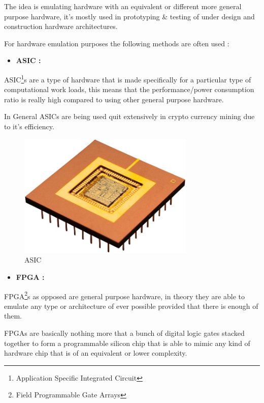 \documentclass[
  14pt,
  english,
  a4paper,
]{scrreprt}
\providecommand{\tightlist}{%
  \setlength{\itemsep}{0pt}\setlength{\parskip}{0pt}}
\begin{document}
The idea is emulating hardware with an equivalent or different more
general purpose hardware, it's mostly used in prototyping \& testing of
under design and construction hardware architectures.

For hardware emulation purposes the following methods are often used :

\begin{itemize}
\tightlist
\item
  \textbf{ASIC :}
\end{itemize}

ASIC\footnote{Application Specific Integrated Circuit}s are a type of
hardware that is made specifically for a particular type of
computational work loads, this means that the performance/power
consumption ratio is really high compared to using other general purpose
hardware.

In General ASICs are being used quit extensively in crypto currency
mining due to it's efficiency.

\begin{figure}
\centering
\includegraphics[width=0.75\textwidth,height=\textheight]{figures/Asic-chip.jpg}
\caption{ASIC}
\end{figure}

\begin{itemize}
\tightlist
\item
  \textbf{FPGA :}
\end{itemize}

FPGA\footnote{Field Programmable Gate Arrays}s as opposed are general
purpose hardware, in theory they are able to emulate any type or
architecture of ever possible provided that there is enough of them.

FPGAs are basically nothing more that a bunch of digital logic gates
stacked together to form a programmable silicon chip that is able to
mimic any kind of hardware chip that is of an equivalent or lower
complexity.
\end{document}
